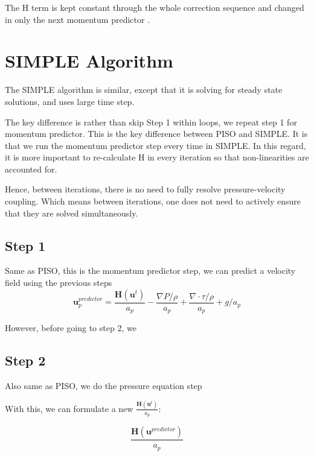 \documentclass[masters]{ucbthesis}
\renewcommand{\_}{\kern-1.5pt\textunderscore\kern-1.5pt}
\begin{document}
The H term is kept constant through the whole correction sequence and 
changed in only the next momentum predictor \citep{jasak1996error}.





\section{SIMPLE Algorithm}

The SIMPLE algorithm is similar, except that it is solving for steady state 
solutions, and uses large time step. 

The key difference is rather than skip Step 1 within loops, we repeat 
step 1 for momentum predictor. This is the key difference between 
PISO and SIMPLE. It is that we run the momentum predictor step every 
time in SIMPLE. In this regard, it is more important to re-calculate 
H in every iteration so that non-linearities are accounted for.

Hence, between iterations, there is no need to fully 
resolve pressure-velocity coupling. Which means 
between iterations, one does not need to actively ensure that they are 
solved simultaneously. 


\subsection{Step 1}

Same as PISO,
this is the momentum predictor step, we can predict a velocity field 
using the previous steps
\begin{equation}
	\textbf{u}_p^{predictor} = \frac{\textbf{H}(\textbf{u}^t)}{a_p}
	- \frac{\nabla P/\rho}{a_p}
	+ \frac{\nabla \cdot \tau /\rho}{a_p}
	+ g/a_p
\end{equation}

However, before going to step 2, we 

\subsection{Step 2}

Also same as PISO, we do the pressure equation step

With this, we can formulate a new $\frac{\textbf{H}(\textbf{u}^t)}{a_p}$:

\begin{equation}
	\frac{\textbf{H}(\textbf{u}^{predictor})}{a_p}
\end{equation}
\end{document}
